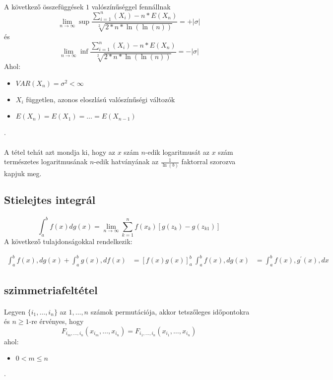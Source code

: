\documentclass[11pt,a4paper]{article}
\begin{document}
				\paragraph{}
					A következő összefüggések $1$ valószínűséggel fennállnak
					$$\lim_{n \to \infty} \sup \dfrac{\sum_{i=1}^n(X_i) - n* E(X_n)}{\sqrt[2]{2*n*\ln(\ln(n))}} = + | \sigma|$$
					és
					$$\lim_{n \to \infty} \inf \dfrac{\sum_{i=1}^n(X_i) - n* E(X_n)}{\sqrt[2]{2*n*\ln(\ln(n))}} = - | \sigma|$$
					Ahol:
					\begin{itemize}
						\item $VAR(X_n) = \sigma^2 < \infty$
						\item $X_i$ független, azonos eloszlású valószínűségi változók
						\item $E(X_n) = E(X_1) = \dots = E(X_{n-1})$
					\end{itemize}.
				\paragraph{}
					A tétel tehát azt mondja ki, hogy az $x$ szám $n$-edik logaritmusát az $x$ szám természetes logaritmusának $n$-edik hatványának az $\frac{1}{\ln(b)}$ faktorral szorozva kapjuk meg.
			\subsection{Stielejtes integrál}
				\paragraph{}
					$$\int_a^b f(x) dg(x) = \lim_{n \to \infty} \sum_{k=1}^n f(x_k)[g(z_k) - g(z_{k1})]$$
					A következő tulajdonságokkal rendelkezik:

					\begin{align*}
						\int_a^b f(x) , dg(x) + \int_a^b g(x) , df(x) &= [f(x) g(x)]_a^b \
						\int_a^b f(x) , dg(x) &= \int_a^b f(x) , g^\prime (x) , dx
					\end{align*}
			\subsection{szimmetriafeltétel}
				\paragraph{}
					Legyen $\{i_1, \dots, i_n\}$ az $1, \dots, n$ számok permutációja, akkor tetszőleges időpontokra és $n \ge 1$-re érvényes, hogy
					$$F_{i_m, \dots, i_n}(x_{i_m}, \dots, x_{i_n}) = F_{i_1, \dots, i_n}(x_{i_1}, \dots, x_{i_n})$$
					ahol:
					\begin{itemize}
						\item $0 < m \le n$ 
					\end{itemize}.
\end{document}
